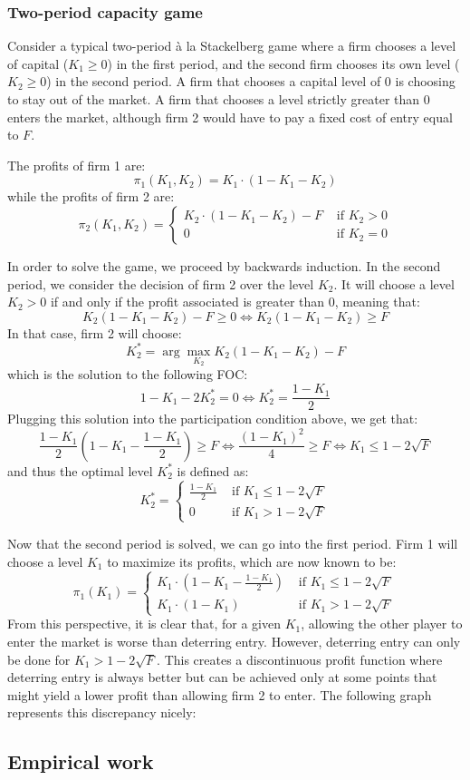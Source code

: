 \subsubsection{Two-period capacity game}

Consider a typical two-period à la Stackelberg game where a firm chooses a level of capital ($K_1 \geq 0$) in the first period, and the second firm chooses its own level ($K_2 \geq 0$) in the second period. A firm that chooses a capital level of $0$ is choosing to stay out of the market. A firm that chooses a level strictly greater than 0 enters the market, although firm 2 would have to pay a fixed cost of entry equal to $F$.

The profits of firm 1 are: $$\pi_1(K_1, K_2) = K_1\cdot (1 - K_1 - K_2) $$
while the profits of firm 2 are: $$ \pi_2(K_1, K_2) = \begin{cases}
K_2\cdot (1 - K_1 - K_2) - F & \text{ if } K_2 > 0 \\
0 & \text{ if } K_2 = 0
\end{cases} $$

In order to solve the game, we proceed by backwards induction. In the second period, we consider the decision of firm 2 over the level $K_2$. It will choose a level $K_2 > 0$ if and only if the profit associated is greater than 0, meaning that: $$ K_2 (1 - K_1 - K_2) - F \geq 0 \Leftrightarrow K_2 (1 - K_1 - K_2) \geq F $$ In that case, firm 2 will choose: $$K_2^* = \arg\max_{K_2} K_2 (1 - K_1 - K_2) - F $$ which is the solution to the following FOC: $$1 - K_1 - 2K_2^* = 0 \Leftrightarrow K_2^* = \frac{1 - K_1}{2} $$ Plugging this solution into the participation condition above, we get that: $$  \frac{1 - K_1}{2} (1 - K_1 - \frac{1 - K_1}{2}) \geq F \Leftrightarrow \frac{(1 - K_1)^2}{4} \geq F \Leftrightarrow K_1 \leq 1 - 2\sqrt{F} $$
and thus the optimal level $K_2^*$ is defined as: $$ K_2^* = \begin{cases}
\frac{1 - K_1}{2} & \text{ if } K_1 \leq 1 - 2\sqrt{F} \\
0 & \text{ if } K_1 > 1 - 2\sqrt{F}
\end{cases} $$

Now that the second period is solved, we can go into the first period. Firm 1 will choose a level $K_1$ to maximize its profits, which are now known to be: $$\pi_1(K_1) = \begin{cases}
K_1 \cdot \left(1 - K_1 - \frac{1 - K_1}{2}\right) & \text{ if } K_1 \leq 1 - 2\sqrt{F} \\
K_1\cdot (1 - K_1) & \text{ if } K_1 > 1 - 2\sqrt{F}
\end{cases} $$ From this perspective, it is clear that, for a given $K_1$, allowing the other player to enter the market is worse than deterring entry. However, deterring entry can only be done for $K_1 > 1 - 2\sqrt{F}$. This creates a discontinuous profit function where deterring entry is always better but can be achieved only at some points that might yield a lower profit than allowing firm 2 to enter. The following graph represents this discrepancy nicely:



\subsection{Empirical work}

 